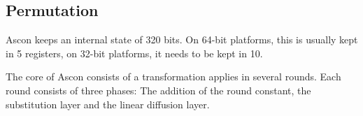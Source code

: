 \subsection{Permutation}

Ascon keeps an internal state of 320 bits. On 64-bit platforms, this is
usually kept in 5 registers, on 32-bit platforms, it needs to be kept in
10.

The core of Ascon consists of a transformation applies in several
rounds. Each round consists of three phases: The addition of the round
constant, the substitution layer and the linear diffusion layer.
